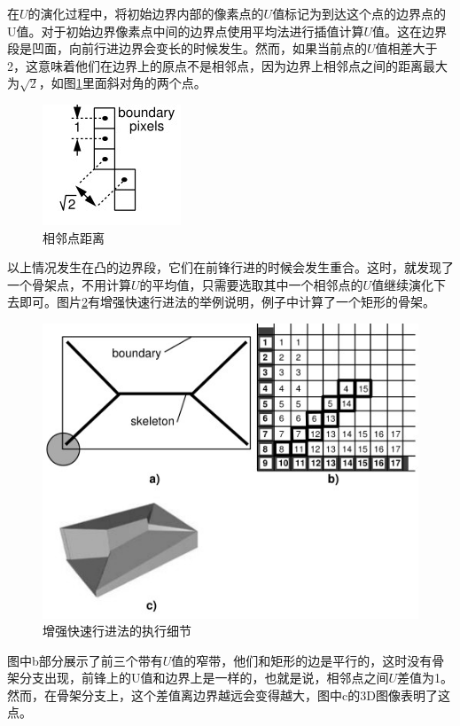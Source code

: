 在$U$的演化过程中，将初始边界内部的像素点的$U$值标记为到达这个点的边界点的U值。对于初始边界像素点中间的边界点使用平均法进行插值计算$U$值。这在边界段是凹面，向前行进边界会变长的时候发生。然而，如果当前点的$U$值相差大于2，这意味着他们在边界上的原点不是相邻点，因为边界上相邻点之间的距离最大为$\sqrt2$，如图\ref{neighbor_distance}里面斜对角的两个点。
\begin{figure}[h!]
    \centering
    \includegraphics[height=70bp]{figure/neighbor_distance.png}
    \caption{相邻点距离}
    \label{neighbor_distance}
\end{figure}
以上情况发生在凸的边界段，它们在前锋行进的时候会发生重合。这时，就发现了一个骨架点，不用计算$U$的平均值，只需要选取其中一个相邻点的$U$值继续演化下去即可。图片\ref{afmm_details}有增强快速行进法的举例说明，例子中计算了一个矩形的骨架。
\begin{figure}[h!]
    \centering
    \includegraphics[height=180bp]{figure/afmm_details.png}
    \caption{增强快速行进法的执行细节}
    \label{afmm_details}
\end{figure}
图中b部分展示了前三个带有$U$值的窄带，他们和矩形的边是平行的，这时没有骨架分支出现，前锋上的U值和边界上是一样的，也就是说，相邻点之间$U$差值为1。然而，在骨架分支上，这个差值离边界越远会变得越大，图中c的3D图像表明了这点。

